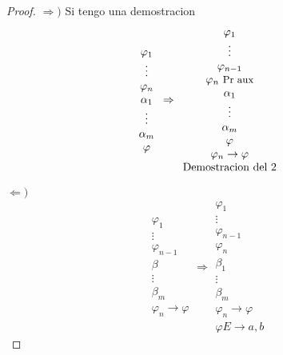 \begin{proof}
	\(\Rightarrow ) \) Si tengo una demostracion
	\[
		\begin{array}{c}
			\varphi_1 \\
			\vdots    \\
			\varphi_n \\
			\alpha_1  \\
			\vdots    \\
			\alpha_m  \\
			\varphi
		\end{array} \Rightarrow \begin{array}{c}
			\varphi_1                       \\
			\vdots                          \\
			\varphi_{n-1}                   \\
			\varphi_n \text{ \small Pr aux} \\
			\alpha_1                        \\
			\vdots                          \\
			\alpha_m                        \\
			\varphi                         \\
			\varphi_n \rightarrow \varphi   \\
			\text{Demostracion del 2}
		\end{array}
	\]

	\(\Leftarrow )\)
	\[
		\begin{array}{c}
			\varphi_1     \\
			\vdots        \\
			\varphi_{n-1} \\
			\beta         \\
			\vdots        \\
			\beta_m       \\
			\varphi_n \rightarrow \varphi
		\end{array} \Rightarrow \begin{array}{c}
			\varphi_1                     \\
			\vdots                        \\
			\varphi_{n-1}                 \\
			\varphi_n                     \\
			\beta_1                       \\
			\vdots                        \\
			\beta_m                       \\
			\varphi_n \rightarrow \varphi \\
			\varphi E\rightarrow a,b
		\end{array}
	\]

\end{proof}

